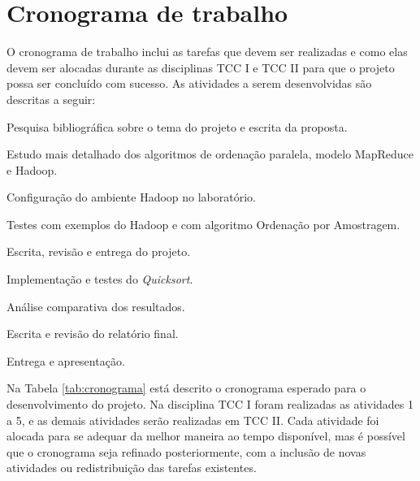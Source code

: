 \section{Cronograma de trabalho}


O cronograma de trabalho inclui as tarefas que devem ser realizadas e como elas devem ser alocadas durante as disciplinas TCC I e TCC II para que o projeto possa ser concluído com sucesso.
As atividades a serem desenvolvidas são descritas a seguir:

\begin{num_enum}
 \item \label{c1} Pesquisa bibliográfica sobre o tema do projeto e escrita da proposta.
 \item \label{c2} Estudo mais detalhado dos algoritmos de ordenação paralela,  modelo MapReduce e Hadoop.
 \item \label{c3} Configuração do ambiente Hadoop no laboratório.
 \item \label{c4} Testes com exemplos do Hadoop e com algoritmo Ordenação por Amostragem.
 \item \label{c5} Escrita, revisão e entrega do projeto.
 \item \label{c6} Implementação e testes do \textit{Quicksort}.
 \item \label{c7} Análise comparativa dos resultados.
 \item \label{c8} Escrita e revisão do relatório final.
 \item \label{c9} Entrega e apresentação.
 \end{num_enum}
 
 
Na Tabela \ref{tab:cronograma} está descrito o cronograma esperado para o desenvolvimento do projeto. Na disciplina TCC I foram realizadas as atividades 1 a 5, e as demais atividades serão realizadas em TCC II. Cada atividade foi alocada para se adequar da melhor maneira ao tempo disponível, mas é possível que o cronograma seja refinado posteriormente, com a inclusão de novas atividades ou redistribuição das tarefas existentes. 


